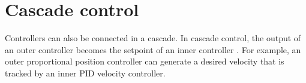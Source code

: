\documentclass[a4paper]{article}
\begin{document}
   \section{Cascade control}
      Controllers can also be connected in a cascade. In cascade control, the output of an outer controller becomes the setpoint of an inner controller \cite{lee-1998-pid-controller-tuning-for-cascade-control-systems}. For example, an outer proportional position controller can generate a desired velocity that is tracked by an inner PID velocity controller.


   
   
\end{document}
